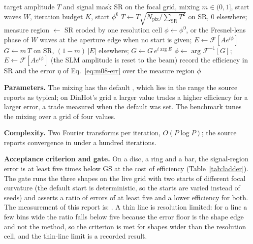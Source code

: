 \begin{algorithm}[t]
\caption{Mixed-region amplitude freedom (the field loop of the engine). The target is rescaled to the input power, the noise region keeps the amplitude it reaches, scaled by $1-m$.}
\label{alg:m08}
\begin{algorithmic}[1]
\Require target amplitude $T$ and signal mask SR on the focal grid, mixing $m\in(0,1]$, start waves $W$, iteration budget $K$, start $\phi^0$
\State $T\gets T\sqrt{N_{\mathrm{pix}}/\sum_{\mathrm{SR}}T^2}$ on SR, $0$ elsewhere; measure region $\gets$ SR eroded by one resolution cell
\State $\phi\gets\phi^0$, or the Fresnel-lens phase of $W$ waves at the aperture edge when no start is given; $E\gets\mathcal F[Ae^{i\phi}]$
  \State $G\gets m\,T$ on SR, $(1-m)\,|E|$ elsewhere; $G\gets G\,e^{i\arg E}$
  \State $\phi\gets\arg\mathcal F^{-1}[G]$; $E\gets\mathcal F[Ae^{i\phi}]$ (the SLM amplitude is reset to the beam)
  \State record the efficiency in SR and the error $\eta$ of Eq.~\eqref{eq:m08-err} over the measure region
\EndFor
\State \Return $\phi$
\end{algorithmic}
\end{algorithm}

\textbf{Parameters.} The mixing has the default , which lies in the range the source reports as typical; on DinHot's grid a larger value trades a higher efficiency for a larger error, a trade measured when the default was set. The benchmark tunes the mixing over a grid of four values.

\textbf{Complexity.} Two Fourier transforms per iteration, $O(P\log P)$; the source reports convergence in under a hundred iterations.

\textbf{Acceptance criterion and gate.} On a disc, a ring and a bar, the signal-region error is at least five times below GS at the cost of efficiency (Table~\ref{tab:ladder}). The gate runs the three shapes on the live grid with two starts of different focal curvature (the default start is deterministic, so the starts are varied instead of seeds) and asserts a ratio of errors of at least five and a lower efficiency for both. The measurement of this report is: . A thin line is resolution limited: for a line a few bins wide the ratio falls below five because the error floor is the shape edge and not the method, so the criterion is met for shapes wider than the resolution cell, and the thin-line limit is a recorded result.

